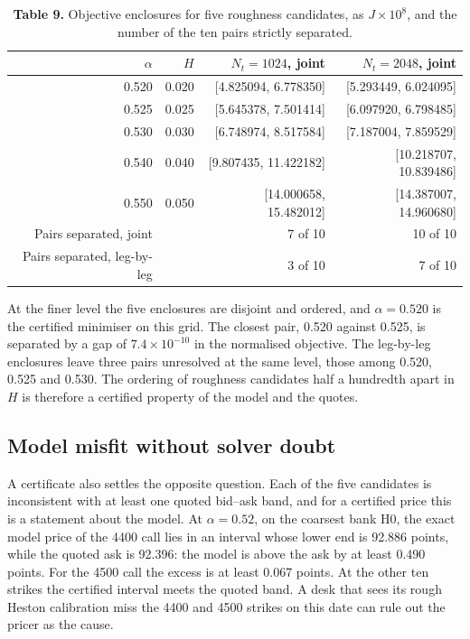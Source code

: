 \documentclass[11pt,a4paper]{article}
\begin{document}
\begin{table}[H]
\caption*{\textbf{Table 9.} Objective enclosures for five roughness candidates, as \(J\times10^8\), and the number of the ten pairs strictly separated.}
\centering\small
\begin{tabular}{@{}rrrr@{}}
\toprule
\(\alpha\) & \(H\) & \(N_t=1024\), joint & \(N_t=2048\), joint \\
\midrule
0.520 & 0.020 & [4.825094, 6.778350] & [5.293449, 6.024095] \\
0.525 & 0.025 & [5.645378, 7.501414] & [6.097920, 6.798485] \\
0.530 & 0.030 & [6.748974, 8.517584] & [7.187004, 7.859529] \\
0.540 & 0.040 & [9.807435, 11.422182] & [10.218707, 10.839486] \\
0.550 & 0.050 & [14.000658, 15.482012] & [14.387007, 14.960680] \\
Pairs separated, joint &  & 7 of 10 & 10 of 10 \\
Pairs separated, leg-by-leg &  & 3 of 10 & 7 of 10 \\
\bottomrule
\end{tabular}
\end{table}

At the finer level the five enclosures are disjoint and ordered, and \(\alpha=0.520\) is the certified minimiser on this grid. The closest pair, 0.520 against 0.525, is separated by a gap of \(7.4\times10^{-10}\) in the normalised objective. The leg-by-leg enclosures leave three pairs unresolved at the same level, those among 0.520, 0.525 and 0.530. The ordering of roughness candidates half a hundredth apart in \(H\) is therefore a certified property of the model and the quotes.

\setcounter{subsection}{5}\subsection{Model misfit without solver doubt}

A certificate also settles the opposite question. Each of the five candidates is inconsistent with at least one quoted bid–ask band, and for a certified price this is a statement about the model. At \(\alpha=0.52\), on the coarsest bank H0, the exact model price of the 4400 call lies in an interval whose lower end is 92.886 points, while the quoted ask is 92.396: the model is above the ask by at least 0.490 points. For the 4500 call the excess is at least 0.067 points. At the other ten strikes the certified interval meets the quoted band. A desk that sees its rough Heston calibration miss the 4400 and 4500 strikes on this date can rule out the pricer as the cause.
\end{document}
